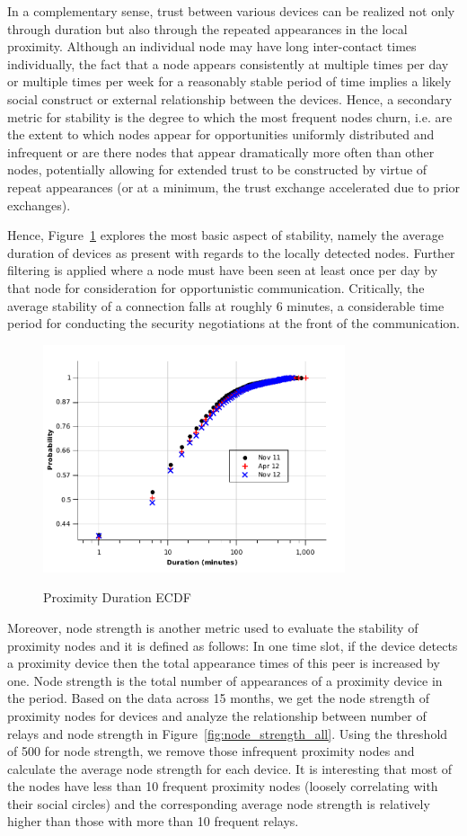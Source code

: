 In a complementary sense, trust between various devices can be realized not only through duration but also through the repeated appearances in the local proximity.  Although an individual node may have long inter-contact times individually, the fact that a node appears consistently at multiple times per day or multiple times per week for a reasonably stable period of time implies a likely social construct or external relationship between the devices.  Hence, a secondary metric for stability is the degree to which the most frequent nodes churn, i.e. are the extent to which nodes appear for opportunities uniformly distributed and infrequent or are there nodes that appear dramatically more often than other nodes, potentially allowing for extended trust to be constructed by virtue of repeat appearances (or at a minimum, the trust exchange accelerated due to prior exchanges).  

Hence, Figure~\ref{fig:duration} explores the most basic aspect of stability, namely the average duration of devices as present with regards to the locally detected nodes. Further filtering is applied where a node must have been seen at least once per day by that node for consideration for opportunistic communication. Critically, the average stability of a connection falls at roughly 6 minutes, a considerable time period for conducting the security negotiations at the front of the communication.  

\begin{figure}[tbp]
\centering 
{\includegraphics[width=3.5in]{graphs/duration_cdf_2.pdf}}
\caption{Proximity Duration ECDF} 
\label{fig:duration}
\end{figure}

Moreover, node strength is another metric used to evaluate the stability of proximity nodes and it is defined as follows: In one time slot, if the device detects a proximity device then the total appearance times of this peer is increased by one. Node strength is the total number of appearances of a proximity device in the period. Based on the data across 15 months, we get the node strength of proximity nodes for devices and analyze the relationship between number of relays and node strength in Figure~\ref{fig:node_strength_all}. Using the threshold of 500 for node strength, we remove those infrequent proximity nodes and calculate the average node strength for each device. It is interesting that most of the nodes have less than 10 frequent proximity nodes (loosely correlating with their social circles) and the corresponding average node strength is relatively higher than those with more than 10 frequent relays. 

